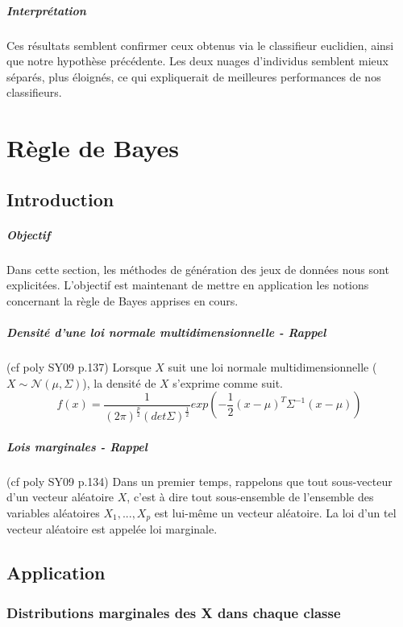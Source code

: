 \documentclass{report}
\begin{document}
\paragraph{Interprétation}
Ces résultats semblent confirmer ceux obtenus via le classifieur euclidien, ainsi que notre hypothèse précédente. Les deux nuages d'individus semblent mieux séparés, plus éloignés, ce qui expliquerait de meilleures performances de nos classifieurs.


\chapter{Règle de Bayes}
\section{Introduction}
\paragraph{Objectif}
Dans cette section, les méthodes de génération des jeux de données nous sont explicitées. L'objectif est maintenant de mettre en application les notions concernant la règle de Bayes apprises en cours.

\paragraph{Densité d'une loi normale multidimensionnelle - Rappel}
(cf poly SY09 p.137) Lorsque $X$ suit une loi normale multidimensionnelle ($X \sim \mathcal{N}(\mu, \Sigma)$), la densité de $X$ s'exprime comme suit.
$$f(x) = \frac{1}{(2\pi)^{\frac{p}{2}}(det \Sigma)^{\frac{1}{2}}}exp(-\frac{1}{2}(x - \mu)^T\Sigma^{-1}(x - \mu))$$

\paragraph{Lois marginales - Rappel}
(cf poly SY09 p.134) Dans un premier temps, rappelons que tout sous-vecteur d'un vecteur aléatoire $X$, c'est à dire tout sous-ensemble de l'ensemble des variables aléatoires $X_1,...,X_p$ est lui-même un vecteur aléatoire. La loi d'un tel vecteur aléatoire est appelée loi marginale.


\newpage
\section{Application}
\subsection{Distributions marginales des X dans chaque classe}
\end{document}
